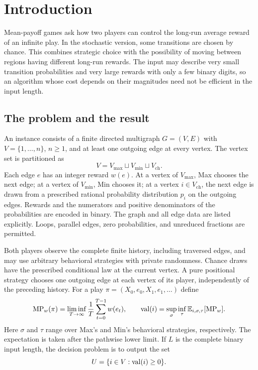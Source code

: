\section{Introduction}
\label{sec:introduction}

Mean-payoff games ask how two players can control the long-run average
reward of an infinite play. In the stochastic version, some transitions
are chosen by chance. This combines strategic choice with the possibility
of moving between regions having different long-run rewards. The input
may describe very small transition probabilities and very large rewards
with only a few binary digits, so an algorithm whose cost depends on
their magnitudes need not be efficient in the input length.

\subsection{The problem and the result}

An instance consists of a finite directed multigraph $G=(V,E)$ with
$V=\{1,\ldots,n\}$, $n\ge1$, and at least one outgoing edge at every
vertex. The vertex set is partitioned as
\[
 V=V_{\max}\sqcup V_{\min}\sqcup V_{\mathrm{ch}}.
\]
Each edge $e$ has an integer reward $w(e)$. At a vertex of $V_{\max}$,
Max chooses the next edge; at a vertex of $V_{\min}$, Min chooses it;
at a vertex $i\in V_{\mathrm{ch}}$, the next edge is drawn from a
prescribed rational probability distribution $p_i$ on the outgoing
edges. Rewards and the numerators and positive denominators of the
probabilities are encoded in binary. The graph and all edge data are
listed explicitly. Loops, parallel edges, zero probabilities, and
unreduced fractions are permitted.

Both players observe the complete finite history, including traversed
edges, and may use arbitrary behavioral strategies with private
randomness. Chance draws have the prescribed conditional law at the
current vertex. A pure positional strategy chooses one outgoing edge at
each vertex of its player, independently of the preceding history.
For a play $\pi=(X_0,e_0,X_1,e_1,\ldots)$ define
\[
 \operatorname{MP}_w(\pi)=\liminf_{T\to\infty}\frac1T\sum_{t=0}^{T-1}w(e_t),
 \qquad
 \operatorname{val}(i)=\sup_\sigma\inf_\tau
           \mathbb E_{i,\sigma,\tau}[\operatorname{MP}_w].
\]
Here $\sigma$ and $\tau$ range over Max's and Min's behavioral
strategies, respectively. The expectation is taken after the pathwise
lower limit. If $L$ is the complete binary input length, the decision
problem is to output the set
\[
                         U=\{i\in V:\operatorname{val}(i)\ge0\}.
\]

